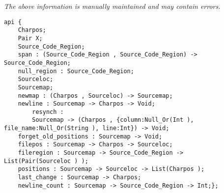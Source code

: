 \label{api:Line\_Number\_Db}

{\tiny \it The above information is manually maintained and may contain errors.}
\begin{verbatim}
api {
    Charpos;
    Pair X;
    Source_Code_Region;
    span : (Source_Code_Region , Source_Code_Region) -> Source_Code_Region;
    null_region : Source_Code_Region;
    Sourceloc;
    Sourcemap;
    newmap : (Charpos , Sourceloc) -> Sourcemap;
    newline : Sourcemap -> Charpos -> Void;
        resynch :
        Sourcemap -> (Charpos , {column:Null_Or(Int ), file_name:Null_Or(String ), line:Int}) -> Void;
    forget_old_positions : Sourcemap -> Void;
    filepos : Sourcemap -> Charpos -> Sourceloc;
    fileregion : Sourcemap -> Source_Code_Region -> List(Pair(Sourceloc ) );
    positions : Sourcemap -> Sourceloc -> List(Charpos );
    last_change : Sourcemap -> Charpos;
    newline_count : Sourcemap -> Source_Code_Region -> Int;};
\end{verbatim}
